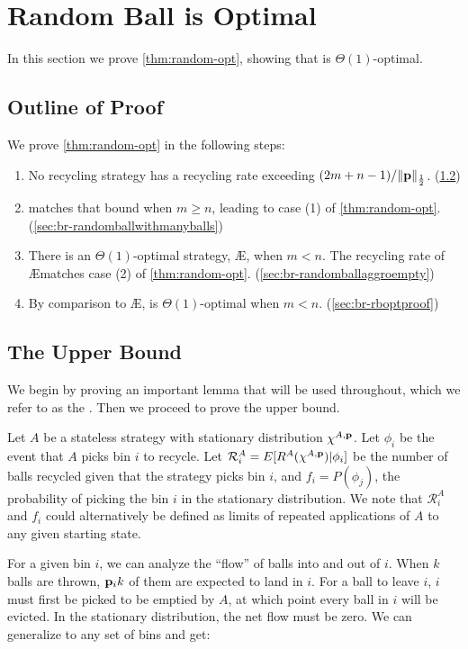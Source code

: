 \section{Random Ball is Optimal}\label{sec:br-nonuniform}

In this section we prove \cref{thm:random-opt}, showing that \RB{} is
$\Theta(1)$-optimal. 

\subsection{Outline of Proof}\label{sec:br-nonuni-outline}
We prove \cref{thm:random-opt} in the following steps:
\begin{enumerate}
	\item No recycling strategy has a recycling rate exceeding
		$(2m+n-1)/\|\mathbf{p}\|_{\frac{1}{2}}$. (\cref{sec:br-upper-statement})
	\item \RB{} matches that bound when $m \geq n$, leading to case (1) of
		\cref{thm:random-opt}. (\cref{sec:br-randomballwithmanyballs})
	\item There is an $\Theta(1)$-optimal strategy, \AE{}, when $m < n$. The
		recycling rate of \AE matches case (2) of \cref{thm:random-opt}.
		(\cref{sec:br-randomballaggroempty})
	\item By comparison to \AE{}, \RB{} is $\Theta(1)$-optimal when $m < n$.
		(\cref{sec:br-rboptproof})
\end{enumerate}

\subsection{The Upper Bound}\label{sec:br-upper-statement}
We begin by proving an important lemma that will be used throughout, which we
refer to as the . Then we proceed to prove the upper bound.

Let $A$ be a stateless strategy with stationary distribution $\chi^{A,\mathbf{p}}$. Let
$\phi_i$ be the event that $A$ picks bin $i$ to recycle. Let $\mathcal{R}_i^A =
E[R^A(\chi^{A,\mathbf{p}}) | \phi_i]$ be the number of balls recycled given that the
strategy picks bin $i$, and $f_i = P(\phi_j)$, the probability of picking the
bin $i$ in the stationary distribution. We note that $\mathcal{R}_i^A$ and
$f_i$ could alternatively be defined as limits of repeated applications of $A$
to any given starting state.

For a given bin $i$, we can analyze the ``flow'' of balls into and out of $i$.
When $k$ balls are thrown, $\mathbf{p}_ik$ of them are expected to land in $i$. For a
ball to leave $i$, $i$ must first be picked to be emptied by $A$, at which
point every ball in $i$ will be evicted. In the stationary distribution, the
net flow must be zero.  We can generalize to any set of bins and get:

